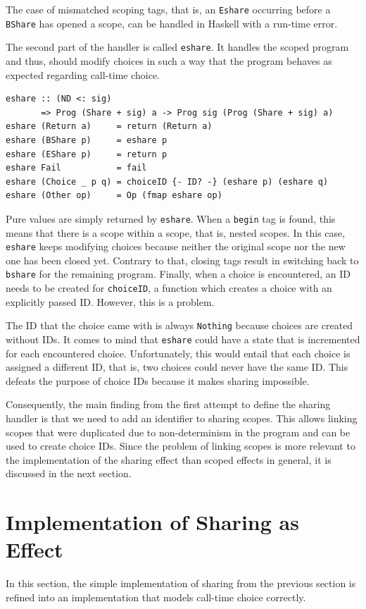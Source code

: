 \documentclass[a4paper, 11pt, fleqn, twoside, abstract=on]{scrreprt}
\newcommand{\hinl}[1]{\texttt{#1}}
\begin{document}
The case of mismatched scoping tags, that is, an \hinl{Eshare} occurring before a \hinl{BShare} has opened a scope, can be handled in Haskell with a run-time error.

The second part of the handler is called \hinl{eshare}.
It handles the scoped program and thus, should modify choices in such a way that the program behaves as expected regarding call-time choice.

\begin{verbatim}
eshare :: (ND <: sig)
       => Prog (Share + sig) a -> Prog sig (Prog (Share + sig) a)
eshare (Return a)     = return (Return a)
eshare (BShare p)     = eshare p
eshare (EShare p)     = return p
eshare Fail           = fail
eshare (Choice _ p q) = choiceID {- ID? -} (eshare p) (eshare q)
eshare (Other op)     = Op (fmap eshare op)
\end{verbatim}
\noindent
Pure values are simply returned by \hinl{eshare}.
When a \hinl{begin} tag is found, this means that there is a scope within a scope, that is, nested scopes.
In this case, \hinl{eshare} keeps modifying choices because neither the original scope nor the new one has been closed yet.
Contrary to that, closing tags result in switching back to \hinl{bshare} for the remaining program.
Finally, when a choice is encountered, an ID needs to be created for  \hinl{choiceID}, a function which creates a choice with an explicitly passed ID.
However, this is a problem.

The ID that the choice came with is always \hinl{Nothing} because choices are created without IDs.
It comes to mind that \hinl{eshare} could have a state that is incremented for each encountered choice.
Unfortunately, this would entail that each choice is assigned a different ID, that is, two choices could never have the same ID.
This defeats the purpose of choice IDs because it makes sharing impossible.

Consequently, the main finding from the first attempt to define the sharing handler is that we need to add an identifier to sharing scopes.
This allows linking scopes that were duplicated due to non-determinism in the program and can be used to create choice IDs.
Since the problem of linking scopes is more relevant to the implementation of the sharing effect than scoped effects in general, it is discussed in the next section.

\section{Implementation of Sharing as Effect}
\label{subsec:sharingImplementation}
In this section, the simple implementation of sharing from the previous section is refined into an implementation that models call-time choice correctly.
\end{document}
